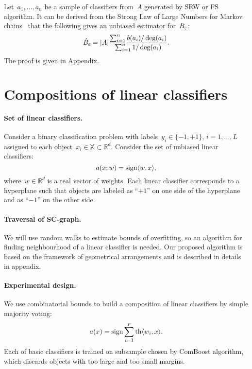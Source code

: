 \documentclass{article}
\let\cite\citep
\def\AA{A}
\def\RR{\mathbb{R}}
\newcommand{\sign}{\mathop{\rm sign}\limits}
\begin{document}
Let~$a_1, \dots, a_n$ be a sample of classifiers from~$\AA$ generated
by SRW or FS algorithm.
It can be derived from the Strong Law of Large Numbers for Markov chains~\cite{roberts2004markovchains}
that the following gives an unbiased estimator for~$B_\varepsilon$:
\begin{equation}
\label{rw_bound_estimate}
    \hat B_\eps
    =
    |\AA|
    \frac{
        \sum_{i = 1}^{n} b(a_i) / \deg(a_i)
    }{
        \sum_{i = 1}^{n} 1 / \deg(a_i)
    }.
\end{equation}
The proof is given in Appendix.

\section{Compositions of linear classifiers}

\paragraph{Set of linear classifiers.}
Consider a binary classification problem with labels~$y_i \in \{-1, +1\}$,
$i = 1, \dots, L$ assigned to each object~$x_i \in \mathbb{X} \subset \RR^d$.
Consider the set of unbiased linear classifiers:
\[
    a(x; w) = \sign \langle w, x \rangle,
\]
where~$w \in \RR^d$ is a real vector of weights.
Each linear classifier corresponds to a hyperplane such that
objects are labeled as ``$+1$'' on one side of the hyperplane and as ``$-1$'' on the other side.

\paragraph{Traversal of SC-graph.}
We will use random walks to estimate bounds of overfitting,
so an algorithm for finding neighbourhood of a linear classifier is needed.
Our proposed algorithm is based on the framework of geometrical arrangements and
is described in details in appendix.

\paragraph{Experimental design.}
We use combinatorial bounds to build a composition of linear classifiers by simple majority voting:
\begin{equation}
\label{linerar_classifier_composition}
    a(x) = \sign \sum_{i = 1}^p \text{th} \langle w_i, x \rangle.
\end{equation}
Each of basic classifiers is trained on subsample chosen by ComBoost algorithm,
which discards objects with too large and too small margins.
\end{document}
